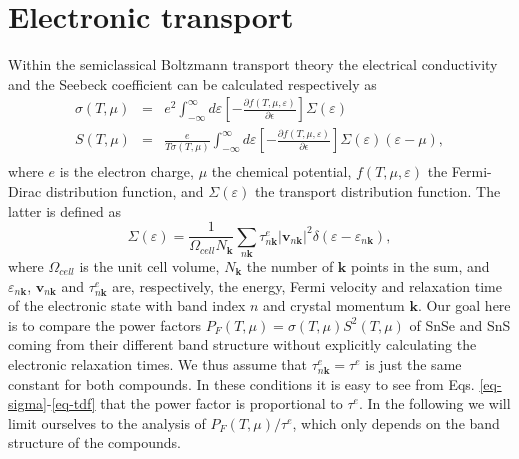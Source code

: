 \section{Electronic transport}

Within the semiclassical Boltzmann transport theory\cite{scheidemantel2003transport} the electrical conductivity and the Seebeck coefficient can be calculated respectively as
\begin{eqnarray}
 \sigma(T,\mu) & = & e^2 \int_{-\infty}^{\infty} d\varepsilon \left[-\frac{\partial f(T,\mu,\varepsilon)}{\partial\epsilon}\right] \Sigma(\varepsilon) 
 \label{eq-sigma}\\
 S(T,\mu) & = & \frac{e}{T\sigma(T,\mu)} \int_{-\infty}^{\infty} d\varepsilon \left[-\frac{\partial f(T,\mu,\varepsilon)}{\partial\epsilon}\right] \Sigma(\varepsilon) (\varepsilon - \mu), \nonumber \\
\label{eq-s}
\end{eqnarray}
where $e$ is the electron charge,  $\mu$ the chemical potential, $ f(T,\mu,\varepsilon)$ the Fermi-Dirac distribution function, and $\Sigma(\varepsilon)$ the transport distribution function. The latter is defined as
\begin{equation}
\Sigma(\varepsilon) = \frac{1}{\Omega_{cell} N_{\mathbf{k}}} \sum_{n\mathbf{k}} \tau^e_{n\mathbf{k}}  |\mathbf{v}_{n\mathbf{k}}|^{2} \delta( \varepsilon-\varepsilon_{n\mathbf{k}} ), 
\label{eq-tdf}
\end{equation}
where $\Omega_{cell}$ is the unit cell volume, $N_{\mathbf{k}}$ the number of $\mathbf{k}$ points in the sum, and $\varepsilon_{n\mathbf{k}} $, $\mathbf{v}_{n\mathbf{k}} $ and  $\tau^e_{n\mathbf{k}}$ are, respectively, the energy, Fermi
velocity and relaxation time of the electronic state with band index $n$ and crystal momentum $\mathbf{k}$. Our goal here is to compare the power factors $P_{F}(T,\mu)=\sigma(T,\mu) S^2(T,\mu)$ of SnSe and SnS coming from
their different band structure without explicitly calculating the electronic relaxation times. We thus assume that $\tau^e_{n\mathbf{k}}=\tau^e$ is just the same constant for both compounds. In these conditions it is easy to see
from Eqs. \eqref{eq-sigma}-\eqref{eq-tdf} that the power factor is proportional to $\tau^e$.  In the following we will limit ourselves to the analysis of $P_{F}(T,\mu)/\tau^e$, which only depends on the band
structure of the compounds. \\

